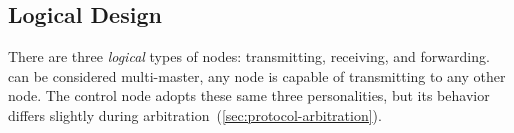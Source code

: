 \subsection{Logical Design}
\label{sec:logical}

There are three {\em logical} types of \bus nodes: transmitting, receiving,
and forwarding. \bus can be considered multi-master, any node is capable of
transmitting to any other node. The control node adopts these same three
personalities, but its behavior differs slightly during
arbitration~(\ref{sec:protocol-arbitration}).

